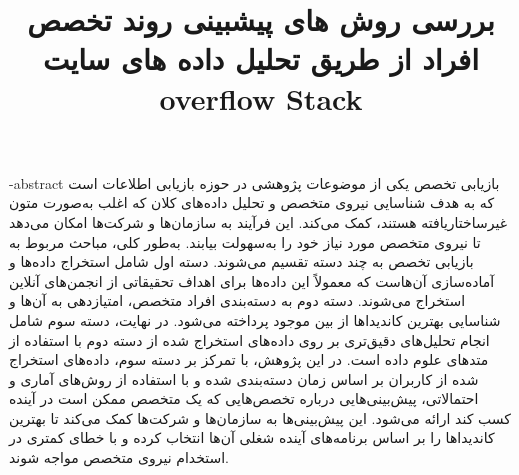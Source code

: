 \documentclass[oneside,openany,msc]{SBU-Thesis}
\begin{document}
	\title{بررسی روش های پیشبینی روند تخصص افراد از طریق تحلیل داده های سایت overflow Stack}
	
	\subject{مهندسی کامپیوتر}
	
	
	
	
	


	
	
	

	\fa-abstract{
		بازیابی تخصص یکی از موضوعات پژوهشی در حوزه بازیابی اطلاعات است که به هدف شناسایی نیروی متخصص و تحلیل داده‌های کلان که اغلب به‌صورت متون غیرساختاریافته هستند، کمک می‌کند. این فرآیند به سازمان‌ها و شرکت‌ها امکان می‌دهد تا نیروی متخصص مورد نیاز خود را به‌سهولت بیابند. به‌طور کلی، مباحث مربوط به بازیابی تخصص به چند دسته تقسیم می‌شوند. دسته اول شامل استخراج داده‌ها و آماده‌سازی آن‌هاست که معمولاً این داده‌ها برای اهداف تحقیقاتی از انجمن‌های آنلاین استخراج می‌شوند. دسته دوم به دسته‌بندی افراد متخصص، امتیازدهی به آن‌ها و شناسایی بهترین کاندیداها از بین موجود پرداخته می‌شود. در نهایت، دسته سوم شامل انجام تحلیل‌های دقیق‌تری بر روی داده‌های استخراج شده از دسته دوم با استفاده از متدهای علوم داده است. در این پژوهش، با تمرکز بر دسته سوم، داده‌های استخراج شده از کاربران بر اساس زمان دسته‌بندی شده و با استفاده از روش‌های آماری و احتمالاتی، پیش‌بینی‌هایی درباره تخصص‌هایی که یک متخصص ممکن است در آینده کسب کند ارائه می‌شود. این پیش‌بینی‌ها به سازمان‌ها و شرکت‌ها کمک می‌کند تا بهترین کاندیداها را بر اساس برنامه‌های آینده شغلی آن‌ها انتخاب کرده و با خطای کمتری در استخدام نیروی متخصص مواجه شوند.
	}
	
\end{document}
